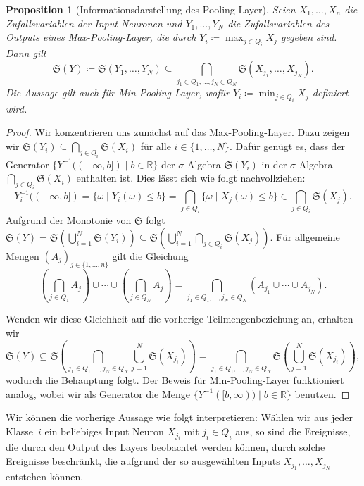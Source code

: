 \documentclass[paper=a4, 	%
		fontsize=11pt,
		abstract=true, 	%
		headsepline, 	%
		notitlepage	%
		]{scrartcl}
\newtheorem{proposition}[theorem]{Proposition}
\theoremstyle{definition}
\newcommand{\R}{\mathbb{R}}
\newcommand{\sig}[1]{\mathfrak{S}{\left( #1 \right)}}
\begin{document}
\begin{proposition}[Informationsdarstellung des Pooling-Layer]
    Seien $X_1,\dots,X_n$ die Zufallsvariablen der Input-Neuronen und $Y_1,\dots,Y_N$ die Zufalls\-variablen des Outputs eines Max-Pooling-Layer, die durch $Y_i\coloneqq \max_{j \in Q_i} X_j$ gegeben sind.
    Dann gilt
    \[
      \sig{Y} \coloneqq \sig{Y_1,\dots,Y_N}\subseteq \bigcap_{j_1\in Q_1,\dots, j_N\in Q_N} \sig{X_{j_1}, \dots, X_{j_N}}  .
    \]
    Die Aussage gilt auch für Min-Pooling-Layer, wofür $Y_i \coloneqq \min_{j\in Q_i} X_j$ definiert wird.
\end{proposition}
\begin{proof}
    Wir konzentrieren uns zunächst auf das Max-Pooling-Layer.
    Dazu zeigen wir $\sig{Y_i} \subseteq \bigcap_{j\in Q_i} \sig{X_i}$ für alle $i\in\{1,\dots,N\}$.
    Dafür genügt es, dass der Generator $\{ Y^{-1}((-\infty, b]) \mid b\in\R \}$ der $\sigma$-Algebra $\sig{Y_i}$ in der $\sigma$-Algebra $\bigcap_{j\in Q_i}\sig{X_i}$ enthalten ist.
    Dies lässt sich wie folgt nachvollziehen:
    \[
        Y_i^{-1}((-\infty, b])
        = \{ \omega \mid Y_i(\omega) \leq b \}
        = \bigcap_{j\in Q_i} \{\omega\mid X_j(\omega) \leq b\}
        \in \bigcap_{j\in Q_i} \sig{X_j}.
    \]
    Aufgrund der Monotonie von $\mathfrak{S}$ folgt $\sig{Y} = \sig{\bigcup_{i=1}^N \sig{Y_i} }\subseteq \sig{ \bigcup_{i=1}^N \bigcap_{j\in Q_i} \sig{X_j} }$.
    Für allgemeine Mengen $(A_j)_{j\in\{1,\dots,n\}}$ gilt die Gleichung
    \[
        \left(\bigcap_{j\in Q_1} A_j\right) 
        \cup \cdots \cup 
        \left(\bigcap_{j\in Q_N} A_j\right) 
        = \bigcap_{j_1\in Q_1, \dots, j_N\in Q_N} 
        \left( 
            A_{j_1} \cup \cdots \cup A_{j_N}
        \right).
    \]

    Wenden wir diese Gleichheit auf die vorherige Teilmengenbeziehung an, erhalten wir
    \[
        \sig{Y} \subseteq 
        \sig{
        \bigcap_{j_1\in Q_1, \dots, j_N\in Q_N} 
        \bigcup_{j=1}^N \sig{X_{j_i}}
        }
        =
        \bigcap_{j_1\in Q_1, \dots, j_N\in Q_N} 
        \sig{
        \bigcup_{j=1}^N \sig{X_{j_i}}
        },
    \]
    wodurch die Behauptung folgt.
    Der Beweis für Min-Pooling-Layer funktioniert analog, wobei wir als Generator die Menge $\{ Y^{-1}([b,\infty)) \mid b\in\R\}$ benutzen.
\end{proof}

Wir können die vorherige Aussage wie folgt interpretieren:
Wählen wir aus jeder Klasse~$i$ ein beliebiges Input Neuron $X_{j_i}$ mit $ j_i \in Q_i$ aus, so sind die Ereignisse, die durch den Output des Layers beobachtet werden können, durch solche Ereignisse beschränkt, die aufgrund der so ausgewählten Inputs $X_{j_1},\dots, X_{j_N}$ entstehen können.
\end{document}
